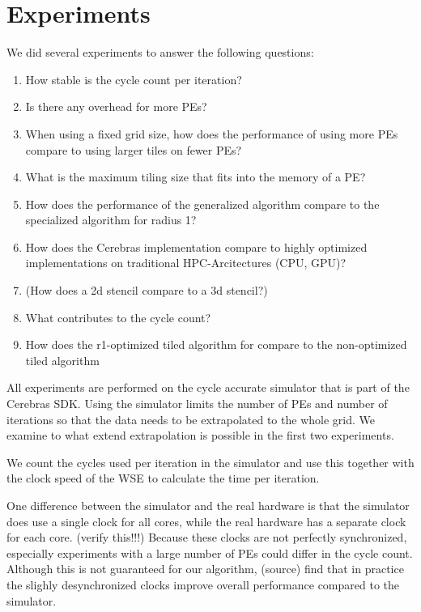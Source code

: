 \chapter{Experiments}
We did several experiments to answer the following questions:
\begin{enumerate}
    \item How stable is the cycle count per iteration?
    \item Is there any overhead for more PEs?
    \item When using a fixed grid size, how does the performance of using more PEs compare to using larger tiles on fewer PEs?
    \item What is the maximum tiling size that fits into the memory of a PE?
    \item How does the performance of the generalized algorithm compare to the specialized algorithm for radius 1?
    \item How does the Cerebras implementation compare to highly optimized implementations on traditional HPC-Arcitectures (CPU, GPU)?
    \item (How does a 2d stencil compare to a 3d stencil?)
    \item What contributes to the cycle count?
    \item How does the r1-optimized tiled algorithm for compare to the non-optimized tiled algorithm
\end{enumerate}

All experiments are performed on the cycle accurate simulator that is part of the Cerebras SDK.
Using the simulator limits the number of PEs and number of iterations so that the data needs to be extrapolated to the whole grid.
We examine to what extend extrapolation is possible in the first two experiments.

We count the cycles used per iteration in the simulator and use this together with the clock speed of the WSE to calculate the time per iteration.

One difference between the simulator and the real hardware is that the simulator does use a single clock for all cores, while the real hardware has a separate clock for each core. (verify this!!!) Because these clocks are not perfectly synchronized, especially experiments with a large number of PEs could differ in the cycle count. Although this is not guaranteed for our algorithm, (source) find that in practice the slighly desynchronized clocks improve overall performance compared to the simulator. 

